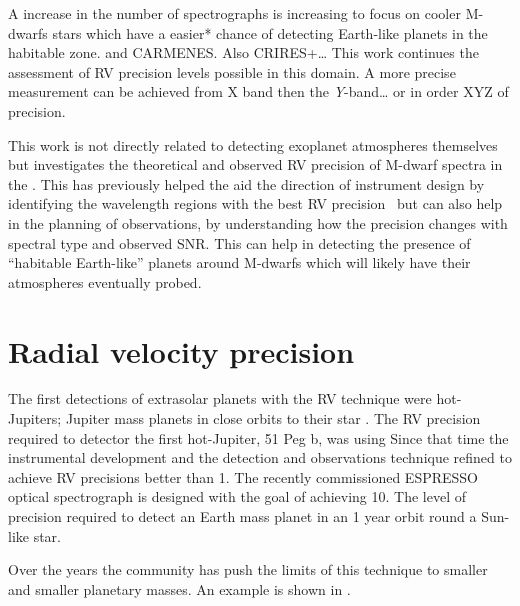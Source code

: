 A increase in the number of \nir{} spectrographs is increasing to focus on cooler {M-dwarfs} stars which have a easier* chance of detecting Earth-like planets in the habitable zone.  and {CARMENES}. Also {CRIRES+}\ldots{}
This work continues the assessment of {RV} precision levels possible in this domain.
 A more precise measurement can be achieved from X band then the \emph{Y}-band\ldots{} or in order XYZ of precision.




This work is not directly related to detecting exoplanet atmospheres themselves but investigates the theoretical and observed {RV} precision of {M-dwarf} spectra in the \nir{}. This has previously helped the aid the direction of instrument design by identifying the wavelength regions with the best {RV} precision~\citep{figueira_radial_2016} but can also help in the planning of observations, by understanding how the precision changes with spectral type and observed {SNR}. This can help in detecting the presence of ``habitable Earth-like'' planets around {M-dwarfs} which will likely have their atmospheres eventually probed.


\section{Radial velocity precision}
The first detections of extrasolar planets with the {RV} technique were hot-Jupiters; Jupiter mass planets in close orbits to their star . The RV precision required to detector the first hot-Jupiter, 51 Peg b, was  \cite{mayor_jupitermass_1995} using  Since that time the instrumental development and the detection and observations technique refined to achieve {RV} precisions better than 1\mps{}. The recently commissioned ESPRESSO optical spectrograph is designed with the goal of achieving 10\cmps{}. The level of precision required to detect an Earth mass planet in an 1 year orbit round a Sun-like star.

Over the years the community has push the limits of this technique to smaller and smaller planetary masses. An example is shown in .

